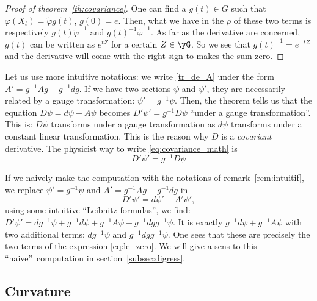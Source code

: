 \begin{proof}[Proof of theorem~\ref{th:covariance}]
	One can find a $g(t)\in G$ such that $\tilde{\varphi}(X_t)=\tilde{\varphi} g(t)$, $g(0)=e$. Then, what we have in the $\rho$ of these two terms is respectively $g(t)\tilde{\varphi}^{-1}$ and $g(t)^{-1}\tilde{\varphi}^{-1}$. As far as the derivative are concerned, $g(t)$ can be written as $e^{tZ}$ for a certain $Z\in\yG$. So we see that $g(t)^{-1}=e^{-tZ}$ and the derivative will come with the right sign to makes the sum zero.
\end{proof}

\begin{remark}
	Let us use more intuitive notations: we write \eqref{tr_de_A} under the form $A'=g^{-1} Ag-g^{-1} dg$. If we have two sections  $\psi$ and $\psi'$, they are necessarily related by a gauge transformation: $\psi'=g^{-1}\psi$. Then, the theorem tells us that the equation $D\psi=d\psi-A\psi$ becomes $D'\psi'=g^{-1} D\psi$ ``under a gauge transformation''. This is: $D\psi$ transforms under a gauge transformation as $d\psi$ transforms under a constant linear transformation. This is the reason why $D$ is a \emph{covariant} derivative. The physicist way to write \eqref{eq:covariance_math} is
	\begin{equation}\label{eq:covariance_phys}
		D'\psi'=g^{-1} D\psi
	\end{equation}
	\label{rem:intuitif}
\end{remark}

\begin{remark}
	If we naively make the computation with the notations of remark~\ref{rem:intuitif}, we replace $\psi'=g^{-1}\psi$ and $A'=g^{-1} Ag-g^{-1} dg$ in
	\[
		D'\psi'=d\psi'-A'\psi',
	\]
	using some intuitive ``Leibnitz formulas'', we find:
	$D'\psi'=dg^{-1}\psi+g^{-1} d\psi+g^{-1} A\psi+g^{-1} dg g^{-1}\psi$. It is exactly $g^{-1} d\psi+g^{-1} A\psi$ with two additional terms: $dg^{-1}\psi$ and $g^{-1} dg g^{-1}\psi$. One sees that these are precisely the two terms of the expression \eqref{eq:le_zero}. We will give a sens to this ``naive''\ computation in section~\ref{subsec:digress}.
\end{remark}

\subsection{Curvature}

